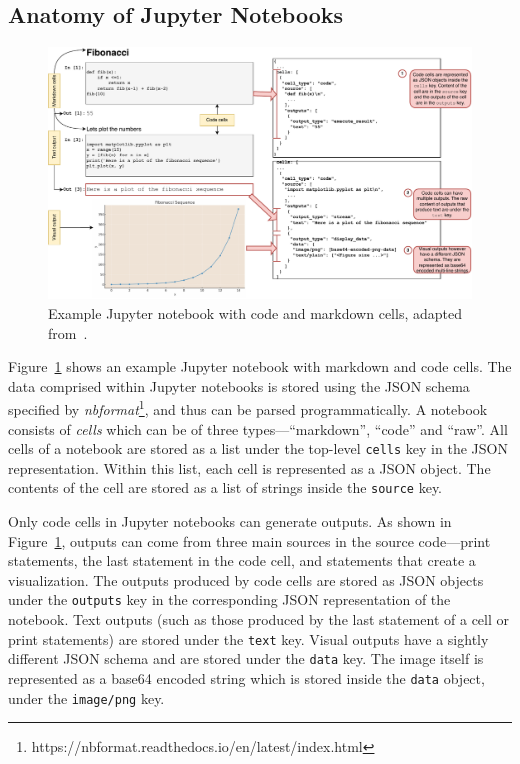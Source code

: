 \documentclass[smallextended]{svjour3}       %
\begin{document}
\subsection{Anatomy of Jupyter Notebooks}

\begin{figure}
  \centering
  \includegraphics[width=\linewidth]{nb.pdf}
  \caption{Example Jupyter notebook with code and markdown cells, adapted from~\citep[Figure~1]{pimentel2019large-scale}.}
  \label{fig:nb}
\end{figure}

Figure~\ref{fig:nb} shows an example Jupyter notebook with markdown and code cells. The data comprised within Jupyter notebooks is stored using the JSON schema specified by \emph{nbformat}\footnote{https://nbformat.readthedocs.io/en/latest/index.html}, and thus can be parsed programmatically. A notebook consists of \emph{cells} which can be of three types---``markdown'', ``code'' and ``raw''. All cells of a notebook are stored as a list under the top-level \lstinline[language={}]$cells$ key in the JSON representation. Within this list, each cell is represented as a JSON object. The contents of the cell are stored as a list of strings inside the \lstinline[language={}]$source$ key.

Only code cells in Jupyter notebooks can generate outputs. As shown in Figure~\ref{fig:nb}, outputs can come from three main sources in the source code---print statements, the last statement in the code cell, and statements that create a visualization. The outputs produced by code cells are stored as JSON objects under the \lstinline[language={}]$outputs$ key in the corresponding JSON representation of the notebook. Text outputs (such as those produced by the last statement of a cell or print statements) are stored under the \lstinline[language={}]$text$ key. Visual outputs have a sightly different JSON schema and are stored under the \lstinline[language={}]$data$ key. The image itself is represented as a base64 encoded string which is stored inside the \lstinline[language={}]$data$ object, under the \lstinline[language={}]$image/png$ key.
\end{document}

